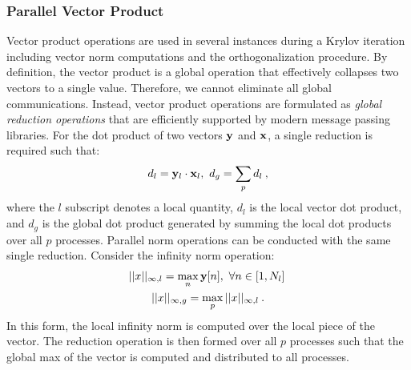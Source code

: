 \subsubsection{Parallel Vector Product}
\label{subsubsec:parallel_vector_product}
Vector product operations are used in several instances during a
Krylov iteration including vector norm computations and the
orthogonalization procedure. By definition, the vector product is a
global operation that effectively collapses two vectors to a single
value. Therefore, we cannot eliminate all global
communications. Instead, vector product operations are formulated as
\textit{global reduction operations} that are efficiently supported by
modern message passing libraries. For the dot product of two vectors
$\mathbf{y}$ and $\mathbf{x}$, a single reduction is required such that:
\begin{equation}
  d_l = \mathbf{y}_l \cdot \mathbf{x}_l,\ d_g = \sum_p d_l \:,  
  \label{eq:parallel_dot_product}
\end{equation}
where the $l$ subscript denotes a local quantity, $d_l$ is the local
vector dot product, and $d_g$ is the global dot product generated by
summing the local dot products over all $p$ processes. Parallel norm
operations can be conducted with the same single reduction. Consider
the infinity norm operation:
\begin{subequations}
  \begin{gather}
    ||x||_{\infty,l} = \max_n \mathbf{y}[n],\ \forall n \in [1,N_l]\:\\
    ||x||_{\infty,g} = \max_p ||x||_{\infty,l}\:.
  \end{gather}
  \label{eq:parallel_infinity_norm}
\end{subequations}
In this form, the local infinity norm is computed over the local piece
of the vector. The reduction operation is then formed over all $p$
processes such that the global max of the vector is computed and
distributed to all processes.

